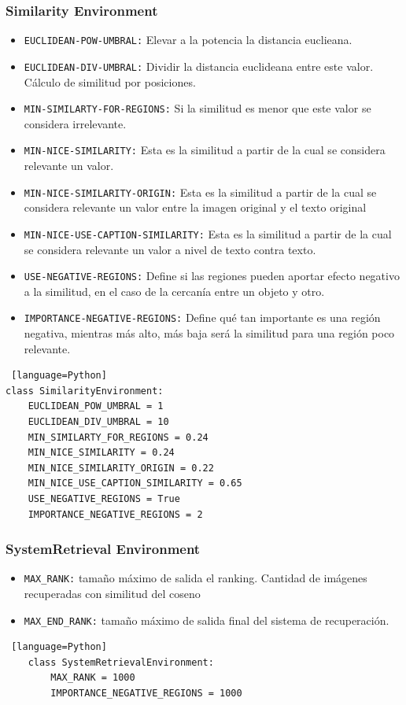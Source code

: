 \subsubsection*{Similarity Environment}

\begin{itemize}
\item \verb|EUCLIDEAN-POW-UMBRAL:| Elevar a la potencia la distancia euclieana.
\item \verb|EUCLIDEAN-DIV-UMBRAL:| Dividir la distancia euclideana entre este valor. C\'alculo de similitud por posiciones. 
\item \verb|MIN-SIMILARTY-FOR-REGIONS:| Si la similitud es menor que este valor se considera irrelevante.
\item \verb|MIN-NICE-SIMILARITY:| Esta es la similitud a partir de la cual se considera relevante un valor.
\item \verb|MIN-NICE-SIMILARITY-ORIGIN:| Esta es la similitud a partir de la cual se considera relevante un valor entre la imagen original y el texto original
\item \verb|MIN-NICE-USE-CAPTION-SIMILARITY:| Esta es la similitud a partir de la cual se considera relevante un valor a nivel de texto contra texto.
\item \verb|USE-NEGATIVE-REGIONS:| Define si las regiones pueden aportar efecto negativo a la similitud, en el caso de la cercan\'ia entre un objeto y otro.
\item \verb|IMPORTANCE-NEGATIVE-REGIONS:| Define qu\'e tan importante es una regi\'on negativa, mientras m\'as alto, m\'as baja ser\'a la similitud para una regi\'on poco relevante.
\end{itemize}
    
\begin{lstlisting} [language=Python]
class SimilarityEnvironment:
    EUCLIDEAN_POW_UMBRAL = 1
    EUCLIDEAN_DIV_UMBRAL = 10
    MIN_SIMILARTY_FOR_REGIONS = 0.24
    MIN_NICE_SIMILARITY = 0.24
    MIN_NICE_SIMILARITY_ORIGIN = 0.22
    MIN_NICE_USE_CAPTION_SIMILARITY = 0.65
    USE_NEGATIVE_REGIONS = True
    IMPORTANCE_NEGATIVE_REGIONS = 2
\end{lstlisting} 

\subsubsection*{SystemRetrieval Environment}
    \begin{itemize}
    \item \verb|MAX_RANK:| tamaño m\'aximo de salida el ranking. Cantidad de im\'agenes recuperadas con similitud del coseno
    \item \verb|MAX_END_RANK:| tamaño m\'aximo de salida final del sistema de recuperaci\'on.
    \end{itemize}
        
    \begin{lstlisting} [language=Python]
    class SystemRetrievalEnvironment:
        MAX_RANK = 1000
        IMPORTANCE_NEGATIVE_REGIONS = 1000
    \end{lstlisting} 
